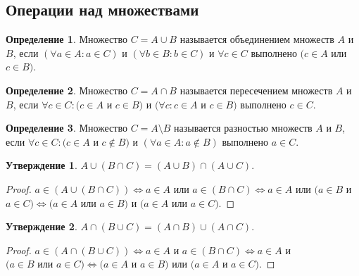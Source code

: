 \documentclass[a4paper, 12pt]{article}
\newcommand{\lra}{\Leftrightarrow}
\theoremstyle{definition}
\newtheorem*{definition}{Определение}
\newtheorem*{statement}{Утверждение}
\begin{document}
    \subsection{Операции над множествами}
        \begin{definition}
            Множество $C=A\cup B$ называется объединением множеств $A$ и $B$, если $(\forall a\in A: a\in C)$ и $(\forall b\in B: b\in C)$ и $\forall c \in C$ выполнено $(c\in A$ или $c\in B)$.
        \end{definition}
        \begin{definition}
            Множество $C=A\cap B$ называется пересечением множеств $A$ и $B$, если $\forall c\in C: (c\in A$ и $c\in B)$ и $(\forall c: c\in A$ и $c\in B)$ выполнено $ c\in C$.
        \end{definition}
        \begin{definition}
            Множество $C=A\setminus B$ называется разностью множеств $A$ и $B$, если $\forall c\in C: (c\in A $ и $c\notin B) $ и $(\forall a\in A: a\notin B)$ выполнено $a\in C$.
        \end{definition}
        \begin{statement}
            $A\cup(B\cap C)=(A\cup B)\cap(A\cup C)$.
        \end{statement}
        \begin{proof} 
            $a\in (A\cup(B\cap C)) \lra a\in A$ или $a\in (B\cap C) \lra a\in A$ или $(a\in B$ и $a\in C) \lra (a\in A$ или $a\in B)$ и $(a\in A$ или $a\in C)$.
        \end{proof}
        \begin{statement}
            $A\cap(B\cup C)=(A\cap B)\cup(A\cap C)$.
        \end{statement}
        \begin{proof}
            $a\in (A\cap(B\cup C)) \lra a\in A$ и $a\in (B\cap C)\lra a\in A$ и \\ $(a\in B$ или $a\in C)\lra (a\in A$ и $a\in B)$ или $(a\in A$ и $a\in C)$.
        \end{proof}
\end{document}
